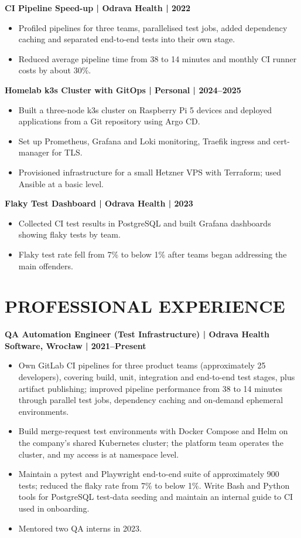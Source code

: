 \documentclass[11pt,a4paper]{article}
\begin{document}
\textbf{CI Pipeline Speed-up | Odrava Health | 2022}
\begin{itemize}
\item Profiled pipelines for three teams, parallelised test jobs, added dependency caching and separated end-to-end tests into their own stage.
\item Reduced average pipeline time from 38 to 14 minutes and monthly CI runner costs by about 30\%.
\end{itemize}

\textbf{Homelab k3s Cluster with GitOps | Personal | 2024--2025}
\begin{itemize}
\item Built a three-node k3s cluster on Raspberry Pi 5 devices and deployed applications from a Git repository using Argo CD.
\item Set up Prometheus, Grafana and Loki monitoring, Traefik ingress and cert-manager for TLS.
\item Provisioned infrastructure for a small Hetzner VPS with Terraform; used Ansible at a basic level.
\end{itemize}

\textbf{Flaky Test Dashboard | Odrava Health | 2023}
\begin{itemize}
\item Collected CI test results in PostgreSQL and built Grafana dashboards showing flaky tests by team.
\item Flaky test rate fell from 7\% to below 1\% after teams began addressing the main offenders.
\end{itemize}

\section*{PROFESSIONAL EXPERIENCE}
\textbf{QA Automation Engineer (Test Infrastructure) | Odrava Health Software, Wrocław | 2021--Present}
\begin{itemize}
\item Own GitLab CI pipelines for three product teams (approximately 25 developers), covering build, unit, integration and end-to-end test stages, plus artifact publishing; improved pipeline performance from 38 to 14 minutes through parallel test jobs, dependency caching and on-demand ephemeral environments.
\item Build merge-request test environments with Docker Compose and Helm on the company’s shared Kubernetes cluster; the platform team operates the cluster, and my access is at namespace level.
\item Maintain a pytest and Playwright end-to-end suite of approximately 900 tests; reduced the flaky rate from 7\% to below 1\%. Write Bash and Python tools for PostgreSQL test-data seeding and maintain an internal guide to CI used in onboarding.
\item Mentored two QA interns in 2023.
\end{itemize}
\end{document}
